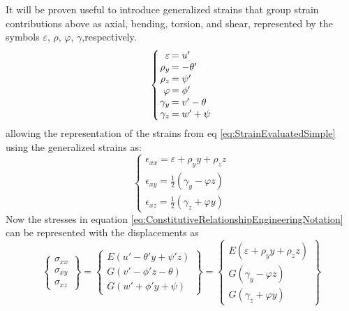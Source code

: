 It will be proven useful to introduce generalized strains that group strain contributions above as axial, bending, torsion, and shear, represented by the symbols $ \varepsilon $, $ \rho $, $ \varphi $, $ \gamma $,respectively.
\begin{equation}\label{eq:GeneralizedStrains}
\left\{\arraycolsep=1pt\begin{array}{rl}
\varepsilon&=u'\\
\rho_{y}&=-\theta'\\
\rho_{z}&=\psi'\\
\varphi&=\phi'\\
\gamma_{y}&=v'-\theta\\
\gamma_{z}&=w'+\psi\end{array}\right.
\end{equation}
allowing the representation of the strains from eq \ref{eq:StrainEvaluatedSimple} using the generalized strains as:
\begin{equation}\label{eq:StrainEvaluatedSimpleGeneralized}
\left\{\begin{array}{l}
\epsilon_{xx}=\varepsilon+\rho_yy+\rho_zz\\
\epsilon_{xy}=\frac{1}{2}(\gamma_y-\varphi z)\\
\epsilon_{xz}=\frac{1}{2}(\gamma_z+\varphi y)
\end{array}\right.
\end{equation}
Now the stresses in equation \ref{eq:ConstitutiveRelationshipEngineeringNotation} can be represented with the displacements as 
\begin{equation}\label{key}
\left\{\begin{array}{c}
\sigma_{xx}\\ \sigma_{xy}\\ \sigma_{xz}
\end{array}\right\} = \left\{\begin{array}{c}
E(u'-\theta'y+\psi'z)\\ G(v'-\phi'z-\theta)\\ G(w'+\phi'y+\psi)
\end{array}\right\} = \left\{\begin{array}{c}
E(\varepsilon+\rho_yy+\rho_zz)\\ G(\gamma_y-\varphi z)\\ G(\gamma_z+\varphi y)
\end{array}\right\}
\end{equation}
